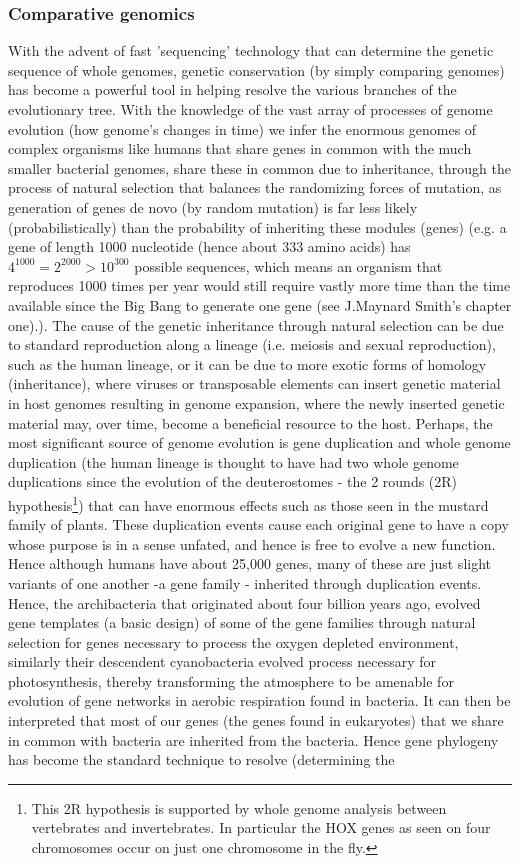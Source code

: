 \subsubsection*{Comparative genomics}
With the advent of fast 'sequencing' technology that can determine the genetic sequence of whole genomes, genetic conservation (by simply comparing genomes) has become a powerful tool in helping resolve the various branches of the evolutionary tree.  With the knowledge of the vast array of processes of genome evolution (how genome's changes in time) we infer the enormous genomes of complex organisms like humans that share genes in common with the much smaller bacterial genomes, share these in common due to inheritance, through the process of natural selection that balances the randomizing forces of mutation, as generation of genes de novo (by random mutation) is far less likely (probabilistically) than the probability of inheriting these modules (genes) (e.g. a gene of length 1000 nucleotide (hence about 333 amino acids) has $4^{1000}=2^{2000} > 10^{300}$ possible sequences, which means an organism that reproduces 1000 times per year would still require vastly more time than the time available since the Big Bang to generate one gene (see J.Maynard Smith's chapter one\cite{maynard}).).  The cause of the genetic inheritance through natural selection can be due to standard reproduction along a lineage (i.e. meiosis and sexual reproduction), such as the human lineage, or it can be due to more exotic forms of homology (inheritance), where viruses or transposable elements can insert genetic material in host genomes resulting in genome expansion, where the newly inserted genetic material may, over time, become a beneficial resource to the host.  Perhaps, the most significant source of genome evolution is gene duplication and whole genome duplication (the human lineage is thought to have had two whole genome duplications since the evolution of the deuterostomes - the 2 rounds (2R) hypothesis\footnote{This 2R hypothesis is supported by whole genome analysis between vertebrates and invertebrates.  In particular the HOX genes as seen on four chromosomes occur on just one chromosome in the fly.}) that can have enormous effects such as those seen in the mustard family of plants.  These duplication events cause each original gene to have a copy whose purpose is in a sense unfated, and hence is free to evolve a new function.  Hence although humans have about 25,000 genes, many of these are just slight variants of one another -a gene family - inherited through duplication events.  Hence, the archibacteria that originated about four billion years ago, evolved gene templates (a basic design) of some of the gene families through natural selection for genes necessary to process the oxygen depleted environment, similarly their descendent cyanobacteria evolved process necessary for photosynthesis, thereby transforming the atmosphere to be amenable for evolution of gene networks in aerobic respiration found in bacteria.  It can then be interpreted that most of our genes (the genes found in eukaryotes) that we share in common with bacteria are inherited from the bacteria.  Hence gene phylogeny has become the standard technique to resolve (determining the 